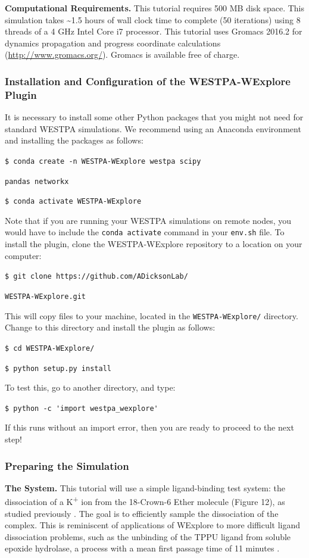 \documentclass[9pt,tutorial,ASAPversion]{livecoms}
\begin{document}
\textbf{Computational Requirements.} This tutorial requires 500 MB disk space. 
This simulation takes \textasciitilde 1.5 hours of wall clock time to complete (50 iterations) using 8 threads of a 4 GHz Intel Core i7 processor.  
This tutorial uses Gromacs 2016.2 for dynamics propagation and progress coordinate calculations (\url{http://www.gromacs.org/}).  
Gromacs is available free of charge.

\subsubsection{Installation and Configuration of the WESTPA-WExplore Plugin}

It is necessary to install some other Python packages that you might not need for standard WESTPA simulations. 
We recommend using an Anaconda environment and installing the packages as follows:

\verb|$ conda create -n WESTPA-WExplore westpa scipy|

\verb|pandas networkx|

\verb|$ conda activate WESTPA-WExplore|

Note that if you are running your WESTPA simulations on remote nodes, you would have to include the \verb|conda activate| command in your \verb|env.sh| file. 
To install the plugin, clone the WESTPA-WExplore repository to a location on your computer:  

\verb|$ git clone https://github.com/ADicksonLab/|

\verb|WESTPA-WExplore.git|

This will copy files to your machine, located in the \verb|WESTPA-WExplore/| directory. 
Change to this directory and install the plugin as follows:

\verb|$ cd WESTPA-WExplore/|

\verb|$ python setup.py install|

To test this, go to another directory, and type:

\verb|$ python -c 'import westpa_wexplore'|

If this runs without an import error, then you are ready to proceed to the next step! 

\subsubsection{Preparing the Simulation}

\textbf{The System.} This tutorial will use a simple ligand-binding test system: the dissociation of a K\textsuperscript{+} ion from the 18-Crown-6 Ether molecule (Figure 12), as studied previously \citep{Zwier2011}. 
The goal is to efficiently sample the dissociation of the complex. 
This is reminiscent of applications of WExplore to more difficult ligand dissociation problems, such as the unbinding of the TPPU ligand from soluble epoxide hydrolase, a process with a mean first passage time of 11 minutes \citep{Lotz2018}.
\end{document}
